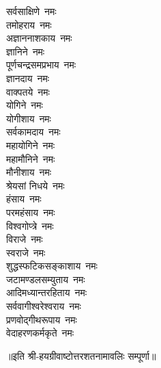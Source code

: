 \begin{flushleft}
\begin{multicols}{2}
सर्वसाक्षिणे~नमः\\
तमोहराय~नमः\\
अज्ञाननाशकाय~नमः\\
ज्ञानिने~नमः\hfill{}\\
पूर्णचन्द्रसमप्रभाय~नमः\\
ज्ञानदाय~नमः\\
वाक्पतये~नमः\\
योगिने~नमः\\
योगीशाय~नमः\\
सर्वकामदाय~नमः\\
महायोगिने~नमः\\
महामौनिने~नमः\\
मौनीशाय~नमः\\
श्रेयसां निधये~नमः\hfill{}\\
हंसाय~नमः\\
परमहंसाय~नमः\\
विश्वगोप्त्रे~नमः\\
विराजे~नमः\\
स्वराजे~नमः\\
शुद्धस्फटिकसङ्काशाय~नमः\\
जटामण्डलसम्युताय~नमः\\
आदिमध्यान्तरहिताय~नमः\\
सर्ववागीश्वरेश्वराय~नमः\\
प्रणवोद्गीथरूपाय~नमः\\
वेदाहरणकर्मकृते~नमः\\
\end{multicols}
\end{flushleft}

॥इति श्री-हयग्रीवाष्टोत्तरशतनामावलिः सम्पूर्णा॥

